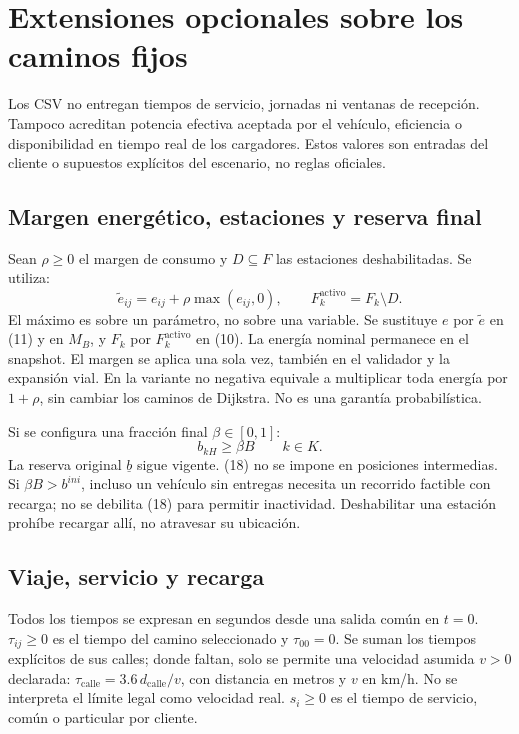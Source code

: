 \documentclass[11pt,a4paper]{article}
\newcommand{\reserve}{\underline b}
\begin{document}
\section{Extensiones opcionales sobre los caminos fijos}
Los CSV no entregan tiempos de servicio, jornadas ni ventanas de recepción.
Tampoco acreditan potencia efectiva aceptada por el vehículo, eficiencia o
disponibilidad en tiempo real de los cargadores. Estos valores son entradas
del cliente o supuestos explícitos del escenario, no reglas oficiales.

\subsection{Margen energético, estaciones y reserva final}
Sean $\rho\ge0$ el margen de consumo y $D\subseteq F$ las estaciones
deshabilitadas. Se utiliza:
\begin{equation}
\widetilde e_{ij}=e_{ij}+\rho\max(e_{ij},0),\qquad
F_k^{\mathrm{activo}}=F_k\setminus D. \tag{17}
\end{equation}
El máximo es sobre un parámetro, no sobre una variable. Se sustituye $e$
por $\widetilde e$ en (11) y en $M_B$, y $F_k$ por
$F_k^{\mathrm{activo}}$ en (10). La energía nominal permanece en el snapshot.
El margen se aplica una sola vez, también en el validador y la expansión vial.
En la variante no negativa equivale a multiplicar toda energía por $1+\rho$,
sin cambiar los caminos de Dijkstra. No es una garantía probabilística.

Si se configura una fracción final $\beta\in[0,1]$:
\begin{equation}
b_{kH}\ge\beta B\qquad k\in K. \tag{18}
\end{equation}
La reserva original $\reserve$ sigue vigente. (18) no se impone en posiciones
intermedias. Si $\beta B>b^{ini}$, incluso un vehículo sin entregas necesita
un recorrido factible con recarga; no se debilita (18) para permitir inactividad.
Deshabilitar una estación prohíbe recargar allí, no atravesar su ubicación.

\subsection{Viaje, servicio y recarga}
Todos los tiempos se expresan en segundos desde una salida común en $t=0$.
$\tau_{ij}\ge0$ es el tiempo del camino seleccionado y $\tau_{00}=0$.
Se suman los tiempos explícitos de sus calles; donde faltan, solo se permite
una velocidad asumida $v>0$ declarada:
$\tau_{\mathrm{calle}}=3.6\,d_{\mathrm{calle}}/v$, con distancia en metros y
$v$ en km/h. No se interpreta el límite legal como velocidad real.
$s_i\ge0$ es el tiempo de servicio, común o particular por cliente.
\end{document}
